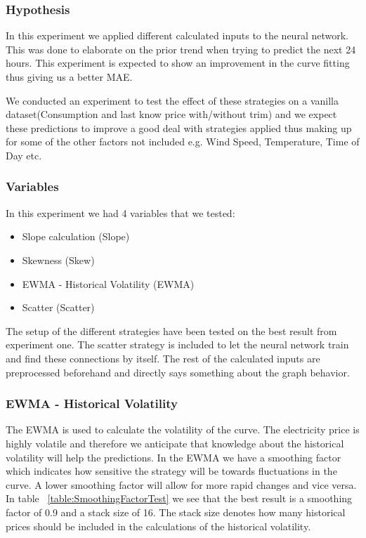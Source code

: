 \subsubsection{Hypothesis}
In this experiment we applied different calculated inputs to the neural network. This was done to elaborate on the prior trend when trying to predict the next 24 hours. This experiment is expected to show an improvement in the curve fitting thus giving us a better MAE.

We conducted an experiment to test the effect of these strategies on a vanilla dataset(Consumption and last know price with/without trim) and we expect these predictions to improve a good deal with strategies applied thus making up for some of the other factors not included e.g. Wind Speed, Temperature, Time of Day etc.

\subsubsection{Variables}
In this experiment we had 4 variables that we tested:
\begin{itemize}
	\item Slope calculation (Slope)
	\item Skewness (Skew)
	\item EWMA - Historical Volatility (EWMA)
	\item Scatter (Scatter)
\end{itemize}

The setup of the different strategies have been tested on the best result from experiment one. The scatter strategy is included to let the neural network train and find these connections by itself. The rest of the calculated inputs are preprocessed beforehand and directly says something about the graph behavior.

\subsubsection{EWMA - Historical Volatility}
The EWMA is used to calculate the volatility of the curve. The electricity price is highly volatile and therefore we anticipate that knowledge about the historical volatility will help the predictions. In the EWMA we have a smoothing factor which indicates how sensitive the strategy will be towards fluctuations in the curve. A lower smoothing factor will allow for more rapid changes and vice versa. In table ~\ref{table:SmoothingFactorTest} we see that the best result is a smoothing factor of 0.9 and a stack size of 16. The stack size denotes how many historical prices should be included in the calculations of the historical volatility.

